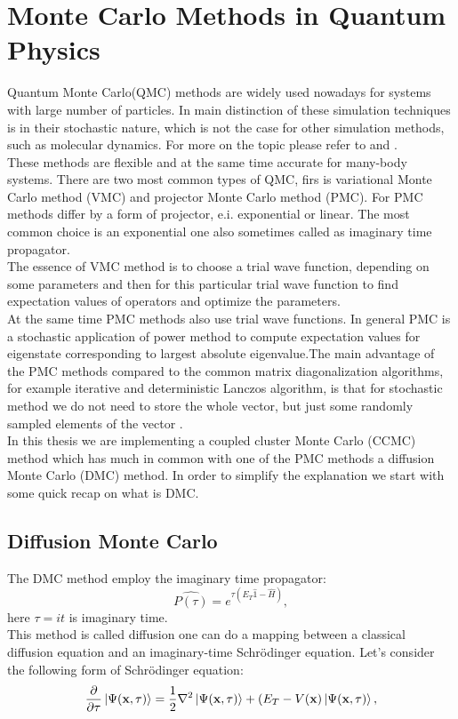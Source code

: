 \documentclass[twoside,english]{uiofysmaster}
\theoremstyle{definition}
\begin{document}
\chapter{Monte Carlo Methods in Quantum Physics}
Quantum Monte Carlo(QMC) methods are widely used nowadays for systems with large number of particles. In main distinction of these simulation techniques is in their stochastic nature, which is not the case for other simulation methods, such as molecular dynamics. For more on the topic please refer to \cite{hammondMonteCarloMethods1994} and \cite{kalosMonteCarloMethods2008}. \\
These methods are flexible and at the same time accurate for many-body systems. There are two most common types of QMC, firs is variational Monte Carlo method (VMC) and projector Monte Carlo method (PMC). For PMC methods differ by a form of projector, e.i. exponential or linear. The most common choice is an exponential one also sometimes called as imaginary time propagator.\\
The essence of VMC method is to choose a trial wave function, depending on some parameters and then for this particular trial wave function to find expectation values of operators and optimize the parameters.\\
At the same time PMC methods also use trial wave functions. In general PMC is a stochastic application of power method to compute expectation values for eigenstate corresponding to largest absolute eigenvalue.The main advantage of the PMC methods compared to the common matrix diagonalization algorithms, for example iterative and deterministic Lanczos algorithm, is that for stochastic method we do not need to store the whole vector, but just some randomly sampled elements of the vector \cite{umrigarObservationsVariationalProjector2015}. \\
In this thesis we are implementing a coupled cluster Monte Carlo (CCMC) method which has much in common with one of the PMC methods a diffusion Monte Carlo (DMC) method. In order to simplify the explanation we start with some quick recap on what is DMC.\\
\section{Diffusion Monte Carlo} \label{sec:DMC}
The DMC method employ the imaginary time propagator:
\begin{equation}
\hat{P(\tau)}=e^{\tau(E_T\hat{1}- \hat{H})},
\end{equation}
here $\tau= it$ is imaginary time.\\
This method is called  diffusion one can do a mapping between a classical diffusion equation and an imaginary-time Schrödinger equation. Let's consider the following form of  Schrödinger equation:
\begin{equation}\label{eq:imaginary_schrod}
		\frac{\partial }{ \partial \tau}\ket{\Psi(\textbf{x},\tau)} = \frac{1}{2} \nabla^2 \ket{\Psi(\textbf{x},\tau)} + (E_T - V(\textbf{x}) \ket{\Psi(\textbf{x},\tau)},
\end{equation}
\end{document}
